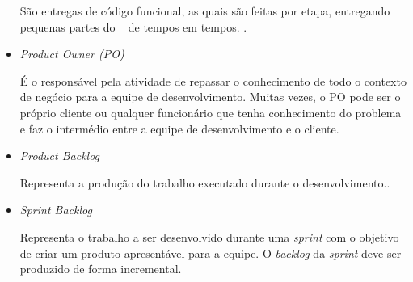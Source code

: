 \begin{itemize}
		São entregas de código funcional, as quais são feitas por etapa, entregando pequenas partes do \sw~ de tempos em tempos. \cite{beck2000extreme}.

	\item \textit{Product Owner (PO)}

		É o responsável pela atividade de repassar o conhecimento de todo o contexto de negócio para a equipe de desenvolvimento. Muitas vezes, o PO pode ser o próprio cliente ou qualquer funcionário que tenha conhecimento do problema e faz o intermédio entre a equipe de desenvolvimento e o cliente. \cite{beck2000extreme}

	\item \textit{Product Backlog}

		Representa a produção do trabalho executado durante o desenvolvimento.\cite{sanches2010aplicaccao}.

	\item \textit{Sprint Backlog}

		Representa o trabalho a ser desenvolvido durante uma \textit{sprint} com o objetivo de criar um produto apresentável para a equipe. O \textit{backlog} da \textit{sprint} deve ser produzido de forma incremental.

\end{itemize}